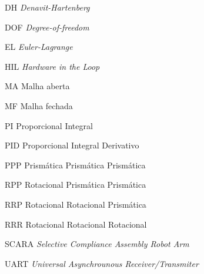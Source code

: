 \begin{siglas}
  \item[DH] \textit{Denavit-Hartenberg}
  \item[DOF] \textit{Degree-of-freedom}
  \item[EL] \textit{Euler-Lagrange}
  \item[HIL] \textit{Hardware in the Loop}
  \item[MA] Malha aberta
  \item[MF] Malha fechada
  \item[PI] Proporcional Integral
  \item[PID] Proporcional Integral Derivativo
  \item[PPP] Prismática Prismática Prismática
  \item[RPP] Rotacional Prismática Prismática
  \item[RRP] Rotacional Rotacional Prismática
  \item[RRR] Rotacional Rotacional Rotacional
  \item[SCARA] \textit{Selective Compliance Assembly Robot Arm}
  \item[UART] \textit{Universal Asynchrounous Receiver/Transmiter}
\end{siglas}